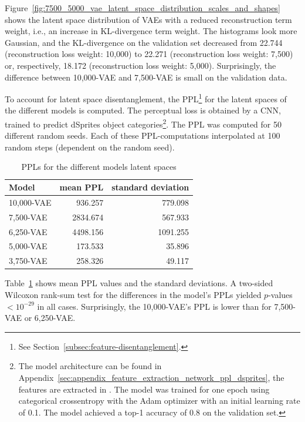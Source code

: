 Figure~\ref{fig:7500_5000_vae_latent_space_distribution_scales_and_shapes} shows the latent space distribution of \acp{VAE} with a reduced reconstruction term weight, i.e., an increase in \ac{KL-divergence} term weight.
The histograms look more Gaussian, and the \ac{KL-divergence} on the validation set decreased from 22.744 (reconstruction loss weight: 10,000) to 22.271 (reconstruction loss weight: 7,500) or, respectively, 18.172 (reconstruction loss weight: 5,000).
Surprisingly, the difference between 10,000-\ac{VAE} and 7,500-\ac{VAE} is small on the validation data.

To account for latent space disentanglement, the \ac{PPL}\footnote{See Section~\ref{subsec:feature-disentanglement}.} for the latent spaces of the different models is computed.
The perceptual loss is obtained by a \ac{CNN}, trained to predict dSprites object categories\footnote{The model architecture can be found in Appendix~\ref{sec:appendix_feature_extraction_network_ppl_dsprites}, the features are extracted in . The model was trained for one epoch using categorical crossentropy with the Adam optimizer with an initial learning rate of 0.1. The model achieved a top-1 accuracy of 0.8 on the validation set.}.
The \ac{PPL} was computed for 50 different random seeds.
Each of these \ac{PPL}-computations interpolated at 100 random steps (dependent on the random seed).

\begin{table}
    \centering
    \begin{tabular}{lrr}
        \toprule
        Model           & mean \ac{PPL} & standard deviation \\
        \midrule
        10,000-\ac{VAE} & 936.257       & 779.098            \\
        7,500-\ac{VAE}  & 2834.674      & 567.933            \\
        6,250-\ac{VAE}  & 4498.156      & 1091.255           \\
        5,000-\ac{VAE}  & 173.533       & 35.896             \\
        3,750-\ac{VAE}  & 258.326       & 49.117             \\
        \bottomrule
    \end{tabular}
    \caption{\acfp{PPL} for the different models latent spaces}
    \label{tab:ppl-dsprites}
\end{table}

Table~\ref{tab:ppl-dsprites} shows mean \ac{PPL} values and the standard deviations.
A two-sided Wilcoxon rank-sum test for the differences in the model's \acp{PPL} yielded $p$-values $< 10^{-29}$ in all cases.
Surprisingly, the 10,000-\ac{VAE}'s \ac{PPL} is lower than for 7,500-\ac{VAE} or 6,250-\ac{VAE}.

